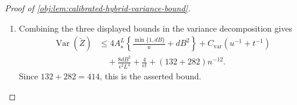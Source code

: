 \begin{proof}[Proof of \cref{obj:lem:calibrated-hybrid-variance-bound}]
\begin{enumerate}
\item Combining the three displayed bounds in the variance decomposition gives
\[
\begin{aligned}
\operatorname{Var}(\widetilde Z)
&\le
4A_\star^L
\left\{
\frac{\min\{1,dB\}}{u}+dB^2
\right\}
+
C_{\mathrm{var}}\left(u^{-1}+t^{-1}\right)\\
&\quad+
\frac{8dB^2}{\epsilon^2L^4}
+
\frac{4}{\epsilon t}
+
(132+282)n^{-12}.
\end{aligned}
\]
Since \(132+282=414\), this is the asserted bound.
\end{enumerate}
\end{proof}
